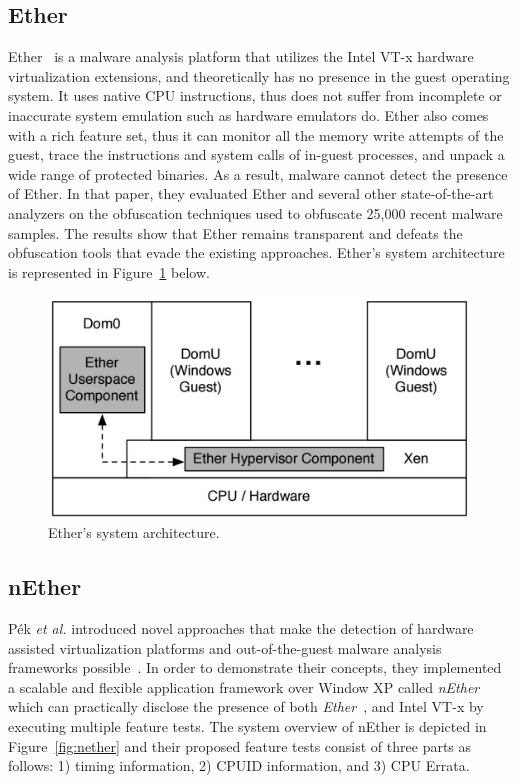 
\subsection{Ether}
Ether~\cite{ether} is a malware analysis platform that utilizes the Intel VT-x
hardware virtualization extensions, and theoretically has no presence in the
guest operating system. It uses native CPU instructions, thus does not suffer
from incomplete or inaccurate system emulation such as hardware emulators do.
Ether also comes with a rich feature set, thus it can monitor all the memory
write attempts of the guest, trace the instructions and system calls of in-guest
processes, and unpack a wide range of protected binaries. As a result, malware
cannot detect the presence of Ether. In that paper, they evaluated Ether and
several other state-of-the-art analyzers on the obfuscation techniques used to
obfuscate 25,000 recent malware samples. The results show that Ether remains
transparent and defeats the obfuscation tools that evade the existing
approaches. Ether's system architecture is represented in Figure~\ref{fig:ether}
below.

\begin{figure}[!h]
	\centering
	\includegraphics[width=\linewidth]{figure/ether.png}
	\caption{Ether's system architecture.}
	\label{fig:ether}
\end{figure}

\subsection{nEther}
P{\'e}k \textit{et al.} introduced novel approaches that make the detection of
hardware assisted virtualization platforms and out-of-the-guest malware analysis
frameworks possible~\cite{nether}. In order to demonstrate their concepts, they
implemented a scalable and flexible application framework over Window XP called
\textit{nEther} which can practically disclose the presence of both
\textit{Ether}~\cite{ether}, and Intel VT-x by executing multiple feature tests.
The system overview of nEther is depicted in Figure~\ref{fig:nether} and their
proposed feature tests consist of three parts as follows: 1) timing information,
2) CPUID information, and 3) CPU Errata.

